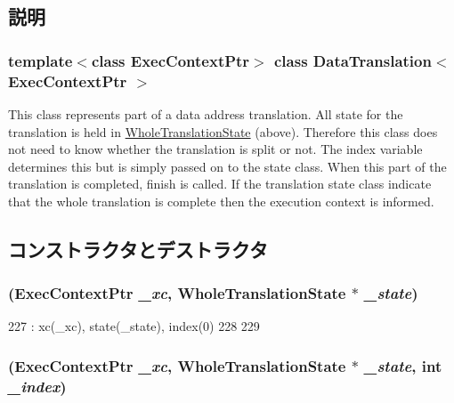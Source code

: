 \subsection{説明}
\subsubsection*{template$<$class ExecContextPtr$>$ class DataTranslation$<$ ExecContextPtr $>$}

This class represents part of a data address translation. All state for the translation is held in \hyperlink{classWholeTranslationState}{WholeTranslationState} (above). Therefore this class does not need to know whether the translation is split or not. The index variable determines this but is simply passed on to the state class. When this part of the translation is completed, finish is called. If the translation state class indicate that the whole translation is complete then the execution context is informed. 

\subsection{コンストラクタとデストラクタ}
\hypertarget{classDataTranslation_aa814ed9c851686410c9efd4a3d8c2d53}{
\subsubsection[{DataTranslation}]{ (ExecContextPtr {\em \_\-xc}, \/  {\bf WholeTranslationState} $\ast$ {\em \_\-state})}}
\label{classDataTranslation_aa814ed9c851686410c9efd4a3d8c2d53}



\begin{DoxyCode}
227         : xc(_xc), state(_state), index(0)
228     {
229     }
\end{DoxyCode}
\hypertarget{classDataTranslation_ae8650a15b755aa7c69728323de568c2c}{
\subsubsection[{DataTranslation}]{ (ExecContextPtr {\em \_\-xc}, \/  {\bf WholeTranslationState} $\ast$ {\em \_\-state}, \/  int {\em \_\-index})}}
\label{classDataTranslation_ae8650a15b755aa7c69728323de568c2c}



